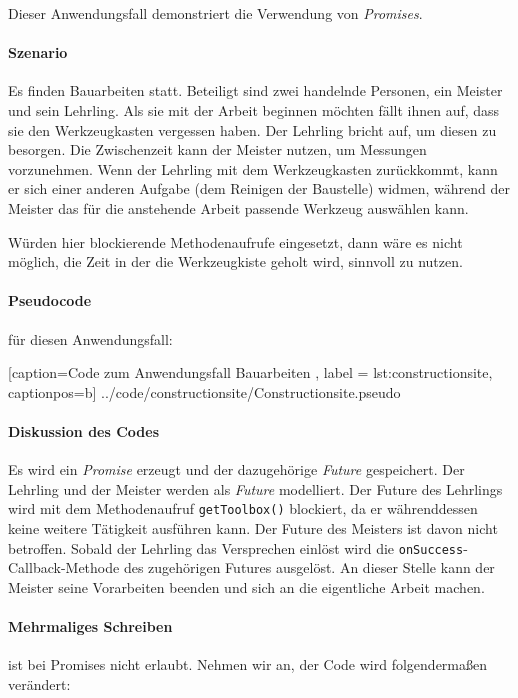 Dieser Anwendungsfall demonstriert die Verwendung von \emph{Promises}.

\paragraph{Szenario}

Es finden Bauarbeiten statt. Beteiligt sind zwei handelnde Personen,
ein Meister und sein Lehrling. Als sie mit der Arbeit beginnen möchten
fällt ihnen auf, dass sie den Werkzeugkasten vergessen haben. Der
Lehrling bricht auf, um diesen zu besorgen. Die Zwischenzeit kann
der Meister nutzen, um Messungen vorzunehmen. Wenn der Lehrling mit
dem Werkzeugkasten zurückkommt, kann er sich einer anderen Aufgabe
(dem Reinigen der Baustelle) widmen, während der Meister das für die
anstehende Arbeit passende Werkzeug auswählen kann.

Würden hier blockierende Methodenaufrufe eingesetzt, dann wäre es nicht
möglich, die Zeit in der die Werkzeugkiste geholt wird, sinnvoll zu
nutzen.

\paragraph{Pseudocode} für diesen Anwendungsfall:


    [caption={Code zum Anwendungsfall \glqq Bauarbeiten\grqq{} },
       label = lst:constructionsite,
       captionpos=b]
 {../code/constructionsite/Constructionsite.pseudo}

\paragraph{Diskussion des Codes}

Es wird ein \emph{Promise} erzeugt und der dazugehörige \emph{Future}
gespeichert. Der Lehrling und der Meister werden als \emph{Future}
modelliert. Der Future des Lehrlings wird mit dem Methodenaufruf
\texttt{getToolbox()} blockiert, da er währenddessen keine weitere
Tätigkeit ausführen kann. Der Future des Meisters ist davon nicht
betroffen. Sobald der Lehrling das Versprechen einlöst wird die
\texttt{onSuccess}-Callback-Methode des zugehörigen Futures ausgelöst.
An dieser Stelle kann der Meister seine Vorarbeiten beenden und sich
an die eigentliche Arbeit machen.

\paragraph{Mehrmaliges Schreiben} ist bei Promises nicht erlaubt.
Nehmen wir an, der Code wird folgendermaßen verändert:

